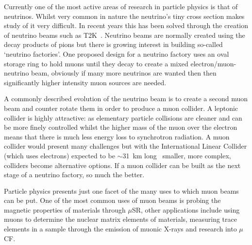 Currently one of the most active areas of research in particle physics is that of neutrinos. Whilst very common in nature the neutrino's tiny cross section makes study of it very difficult. In recent years this has been solved through the creation of neutrino beams such as T2K~\cite{t2k_cdr}. Neutrino beams are normally created using the decay products of pions but there is growing interest in building so-called `neutrino factories'. One proposed design for a neutrino factory uses an oval storage ring to hold muons until they decay to create a mixed electron/muon-neutrino beam, obviously if many more neutrinos are wanted then then significantly higher intensity muon sources are needed.

A commonly described evolution of the neutrino beam is to create a second muon beam and counter rotate them in order to produce a muon collider. A leptonic collider is highly attractive: as elementary particle collisions are cleaner and can be more finely controlled whilst the higher mass of the muon over the electron means that there is much less energy loss to synchrotron radiation. A muon collider would present many challenges but with the International Linear Collider (which uses electrons) expected to be \(\sim\)31~km long~\cite{ilc} smaller, more complex, colliders become alternative options. If a muon collider can be built as the next stage of a neutrino factory, so much the better.

Particle physics presents just one facet of the many uses to which muon beams can be put. One of the most common uses of muon beams is probing the magnetic properties of materials through \(\mu\)SR, other applications include using muons to determine the nuclear matrix elements of materials, measuring trace elements in a sample through the emission of muonic X-rays and research into \(\mu\)CF.

